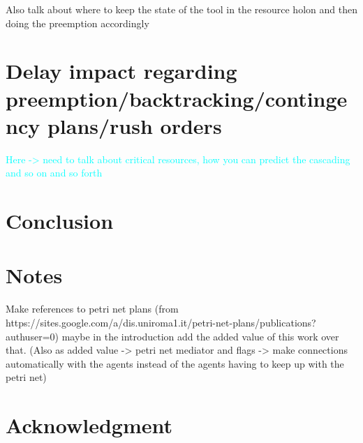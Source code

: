 \documentclass[a4paper,10pt]{article}
\begin{document}
Also talk about where to keep the state of the tool in the resource holon and then doing the preemption accordingly


\section{Delay impact regarding preemption/backtracking/contingency plans/rush orders}
\textcolor{cyan}{Here -> need to talk about critical resources, how you can predict the cascading and so on and so forth}

\section{Conclusion}

\section{Notes}

Make references to petri net plans (from https://sites.google.com/a/dis.uniroma1.it/petri-net-plans/publications?authuser=0) maybe in the introduction add the added value of this work over that. (Also as added value -> petri net mediator and flags -> make connections automatically with the agents instead of the agents having to keep up with the petri net)


\section*{Acknowledgment}



\end{document}
